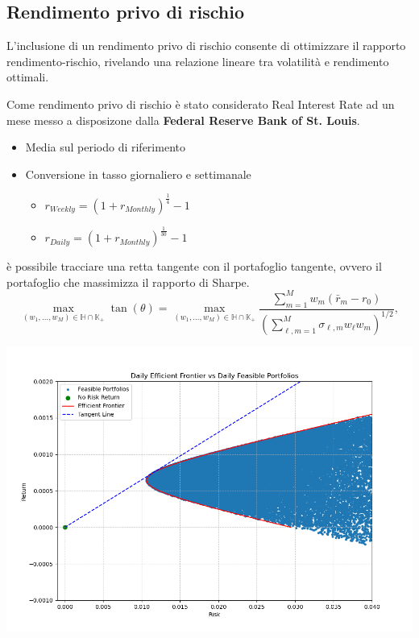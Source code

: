 \documentclass[compress]{beamer}
\begin{document}
\subsection{Rendimento privo di rischio}
\begin{frame}{\subsecname}
	L'inclusione di un rendimento privo di rischio consente di ottimizzare il rapporto rendimento-rischio, rivelando una relazione lineare tra volatilità e rendimento ottimali. 

	Come rendimento privo di rischio è stato considerato Real Interest Rate ad un mese messo a disposizone dalla \textbf{Federal Reserve Bank of St. Louis}. 

	\begin{itemize}
		\item Media sul periodo di riferimento
		\item Conversione in tasso giornaliero e settimanale
		\begin{itemize}
			\item \( r_{Weekly} = (1 + r_{Monthly})^\frac{1}{4} - 1 \)
			\item \( r_{Daily} = (1 + r_{Monthly})^\frac{1}{30} - 1 \)
		\end{itemize}
	\end{itemize}
\end{frame}

\begin{frame}{\subsecname}
	è possibile tracciare una retta tangente con il portafoglio tangente, ovvero il portafoglio che massimizza il rapporto di Sharpe. \\
	\vspace{-0.4cm}
	\[
		\max_{(w_1, \dots, w_M) \in \mathbb{H} \cap \mathbb{K}_+} \tan(\theta) =
		\max_{(w_1, \dots, w_M) \in \mathbb{H} \cap \mathbb{K}_+} 
		\frac{\sum_{m=1}^{M} w_m (\bar{r}_m - r_0)}
		{\left( \sum_{\ell, m=1}^{M} \sigma_{\ell, m} w_{\ell} w_m \right)^{1/2}},
	\]
	
	\begin{center}
		\begin{minipage}{0.6\textwidth}
			\centering
			\includegraphics[width=1\linewidth]{images/Daily Efficient Frontier vs Daily Feasible Portfolios.png}
		\end{minipage}
	\end{center}
\end{frame}
\end{document}
